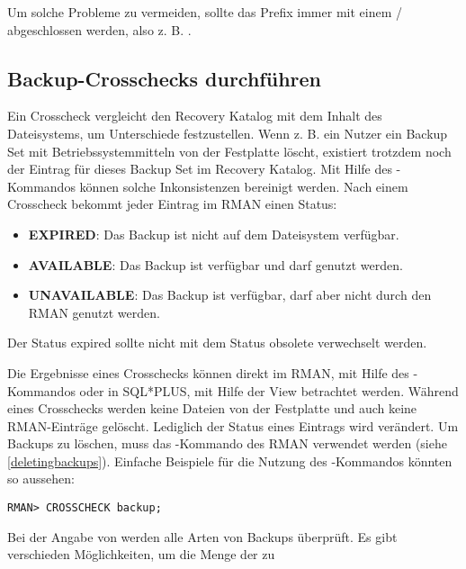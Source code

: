         \begin{merke}
          Um solche Probleme zu vermeiden, sollte das Prefix immer mit einem / abgeschlossen werden, also z. B. .
        \end{merke}
      \subsection{Backup-Crosschecks durchf\"uhren}
        Ein Crosscheck vergleicht den Recovery Katalog mit dem Inhalt des Dateisystems, um Unterschiede festzustellen. Wenn z. B. ein Nutzer ein Backup Set mit Betriebssystemmitteln von der Festplatte l\"oscht, existiert trotzdem noch der Eintrag f\"ur dieses Backup Set im Recovery Katalog. Mit Hilfe des -Kommandos k\"onnen solche Inkonsistenzen bereinigt werden.
        Nach einem Crosscheck bekommt jeder Eintrag im RMAN einen Status:
        \begin{itemize}
          \item \textbf{EXPIRED}: Das Backup ist nicht auf dem Dateisystem verf\"ugbar.
          \item \textbf{AVAILABLE}: Das Backup ist verf\"ugbar und darf genutzt werden.
          \item \textbf{UNAVAILABLE}: Das Backup ist verf\"ugbar, darf aber nicht durch den RMAN genutzt werden.
        \end{itemize}
        \begin{merke}
          Der Status expired sollte nicht mit dem Status obsolete verwechselt werden.
        \end{merke}
        Die Ergebnisse eines Crosschecks k\"onnen direkt im RMAN, mit Hilfe des -Kommandos oder in SQL*PLUS, mit Hilfe der View  betrachtet werden. W\"ahrend eines Crosschecks werden keine Dateien von der Festplatte und auch keine RMAN-Eintr\"age gel\"oscht. Lediglich der Status eines Eintrags wird ver\"andert. Um Backups zu l\"oschen, muss das -Kommando des RMAN verwendet werden (siehe \ref{deletingbackups}).
        Einfache Beispiele f\"ur die Nutzung des -Kommandos k\"onnten so aussehen:
        \begin{lstlisting}[caption={\languagerman{CROSSCHECK} aller Backups},label=admin1332,language=rman]
RMAN> CROSSCHECK backup;
        \end{lstlisting}
        Bei der Angabe von  werden alle Arten von Backups
        \"uberpr\"uft. Es gibt verschieden M\"oglichkeiten, um die Menge der zu
